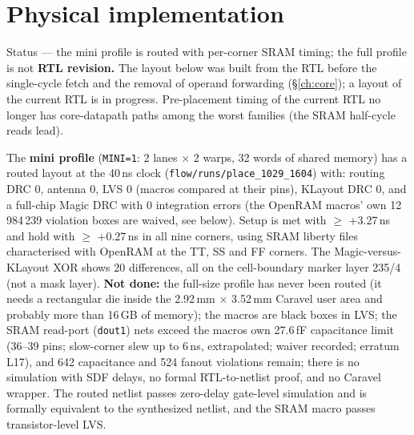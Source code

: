 \documentclass[10pt,a4paper]{report}
\begin{document}
\section{Physical implementation}\label{sec:flow}
\begin{statbox}{Status --- the mini profile is routed with per-corner SRAM timing; the full profile is not}
\textbf{RTL revision.} The layout below was built from the RTL before the single-cycle fetch and the removal of operand forwarding
(\S\ref{ch:core}); a layout of the current RTL is in progress. Pre-placement timing of the current RTL no longer has core-datapath
paths among the worst families (the SRAM half-cycle reads lead).\par
The \textbf{mini profile} (\texttt{MINI=1}: 2 lanes $\times$ 2 warps, 32 words of shared memory) has a routed layout at the 40\,ns clock (\texttt{flow/runs/place\_1029\_1604}) with:
routing DRC 0, antenna 0, LVS 0 (macros compared at their pins), KLayout DRC 0, and a full-chip Magic DRC with 0 integration errors (the OpenRAM macros' own 12\,984\,239 violation boxes are
waived, see below). Setup is met with $\geq$ +3.27\,ns and hold with $\geq$ +0.27\,ns in all nine corners, using SRAM liberty files characterised with OpenRAM at the TT, SS and FF corners.
The Magic-versus-KLayout XOR shows 20 differences, all on the cell-boundary marker layer 235/4 (not a mask layer).
\textbf{Not done:} the full-size profile has never been routed (it needs a rectangular die inside the 2.92\,mm $\times$ 3.52\,mm Caravel user area and probably more than 16\,GB of memory);
the macros are black boxes in LVS; the SRAM read-port (\texttt{dout1}) nets exceed the macro\textquotesingle s own 27.6\,fF capacitance limit (36--39 pins; slow-corner slew up to 6\,ns, extrapolated; waiver recorded; erratum L17), and 642 capacitance and 524 fanout violations remain;
there is no simulation with SDF delays, no formal RTL-to-netlist proof, and no Caravel wrapper. The routed netlist passes zero-delay gate-level simulation and is formally equivalent to the synthesized netlist, and the SRAM macro passes transistor-level LVS.
\end{statbox}
\end{document}
